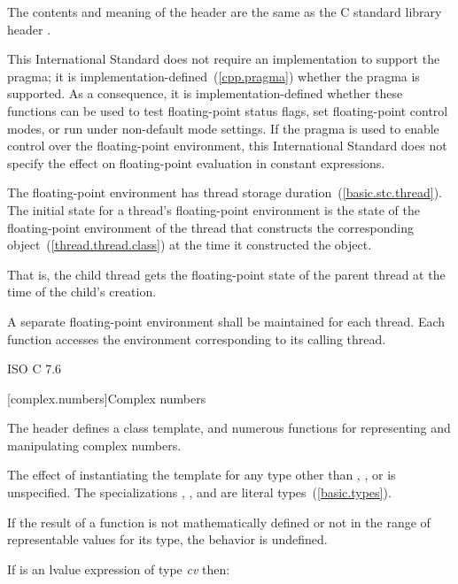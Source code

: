 \pnum
The contents and meaning of the header 
are the same as the C standard library header .
\begin{note}
This International Standard does not require an implementation to support the
 pragma;
it is implementation-defined~(\ref{cpp.pragma}) whether the pragma is supported.
As a consequence,
it is implementation-defined whether these functions can be used to
test floating-point status flags,
set floating-point control modes, or
run under non-default mode settings.
If the pragma is used to enable control over the floating-point environment,
this International Standard does not specify the effect on
floating-point evaluation in constant expressions.
\end{note}

\pnum
The floating-point environment has thread storage
duration~(\ref{basic.stc.thread}). The initial state for a thread's floating-point
environment is the state of the floating-point environment of the thread that constructs
the corresponding  object~(\ref{thread.thread.class}) at the time it
constructed the object. \begin{note} That is, the child thread gets the floating-point
state of the parent thread at the time of the child's creation. \end{note}

\pnum
A separate floating-point environment shall be maintained for each thread. Each function
accesses the environment corresponding to its calling thread.

\xref ISO C 7.6

[complex.numbers]{Complex numbers}

\pnum
The header
%
defines a
class template,
and numerous functions for representing and manipulating complex numbers.

\pnum
The effect of instantiating the template
for any type other than , , or  is unspecified.
The specializations
,
, and
 are literal types~(\ref{basic.types}).

\pnum
If the result of a function is not mathematically defined or not in
the range of representable values for its type, the behavior is
undefined.

\pnum
If  is an lvalue expression of type \emph{cv}  then:

